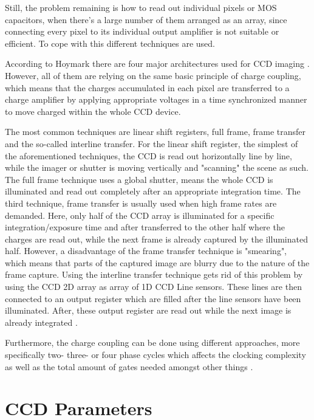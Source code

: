  Still, the problem remaining is how to read out individual pixels or MOS capacitors, when there's a large number of them arranged as an array, since connecting every pixel to its individual output amplifier is not suitable or efficient. To cope with this different techniques are used. \par
 According to Hoymark there are four major architectures used for CCD imaging \citep{hoymorksensors}. However, all of them are relying on the same basic principle of charge coupling, which means that the charges accumulated in each pixel are transferred to a charge amplifier by applying appropriate voltages in a time synchronized manner to move charged within the whole CCD device.
 
 The most common techniques are linear shift registers, full frame, frame transfer and the so-called interline transfer.
 For the linear shift register, the simplest of the aforementioned techniques, the CCD is read out horizontally line by line, while the imager or shutter is moving vertically and "scanning" the scene as such.
 The full frame technique uses a global shutter, means the whole CCD is illuminated and read out completely after an appropriate integration time. 
 The third technique, frame transfer is usually used when high frame rates are demanded. Here, only half of the CCD array is illuminated for a specific integration/exposure time and after transferred to the other half where the charges are read out, while the next frame is already captured by the illuminated half.
 However, a disadvantage of the frame transfer technique is "smearing", which means that parts of the captured image are blurry due to the nature of the frame capture.
 Using the interline transfer technique gets rid of this problem by using the CCD 2D array as array of 1D CCD Line sensors. These lines are then connected to an output register which are filled after the line sensors have been illuminated. After, these output register are read out while the next image is already integrated \citep{hoymorksensors}.
 
 Furthermore, the charge coupling can be done using different approaches, more specifically two- three- or four phase cycles which affects the clocking complexity as well as the total amount of gates needed amongst other things \citep{ccdimaging}.
 



\section{CCD Parameters}

